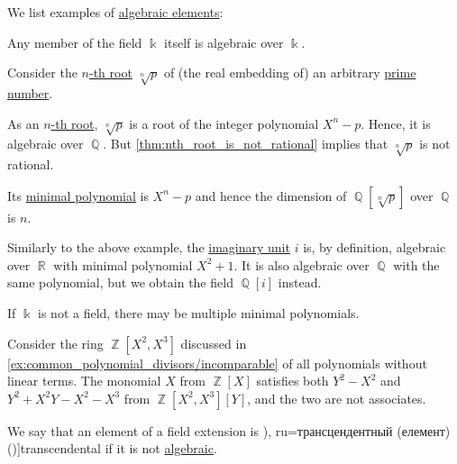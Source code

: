 \begin{example}\label{ex:def:algebraic_element}
  We list examples of \hyperref[def:algebraic_element]{algebraic elements}:
  \begin{thmenum}
     Any member of the field \( \Bbbk \) itself is algebraic over \( \Bbbk \).

     Consider the \hyperref[def:principal_nonnegative_nth_root]{\( n \)-th root} \( \sqrt[n]{ p } \) of (the real embedding of) an arbitrary \hyperref[def:prime_number]{prime number}.

    As an \hyperref[def:semigroup_power]{\( n \)-th root}, \( \sqrt[n]{ p } \) is a root of the integer polynomial \( X^n - p \). Hence, it is algebraic over \( \BbbQ \). But \cref{thm:nth_root_is_not_rational} implies that \( \sqrt[n]{ p } \) is not rational.

    Its \hyperref[def:algebraic_element_minimal_polynomial]{minimal polynomial} is \( X^n - p \) and hence the dimension of \( \BbbQ[\sqrt[n]{ p }] \) over \( \BbbQ \) is \( n \).

     Similarly to the above example, the \hyperref[def:complex_numbers]{imaginary unit} \( i \) is, by definition, algebraic over \( \BbbR \) with minimal polynomial \( X^2 + 1 \). It is also algebraic over \( \BbbQ \) with the same polynomial, but we obtain the field \( \BbbQ[i] \) instead.

     If \( \Bbbk \) is not a field, there may be multiple minimal polynomials.

    Consider the ring \( \BbbZ[X^2, X^3] \) discussed in \cref{ex:common_polynomial_divisors/incomparable} of all polynomials without linear terms. The monomial \( X \) from \( \BbbZ[X] \) satisfies both \( Y^2 - X^2 \) and \( Y^2 + X^2Y - X^2 - X^3 \) from \( \BbbZ[X^2, X^3][Y] \), and the two are not associates.
  \end{thmenum}
\end{example}

\begin{definition}\label{def:transcendental_element}
  We say that an element of a field extension is \term[bg=трансцендентен (елемент) (\cite[423]{Обрешков1962ВисшаАлгебра}), ru=трансцендентный (елемент) (\cite[407]{Винберг2014КурсАлгебры})]{transcendental} if it is not \hyperref[def:algebraic_element]{algebraic}.
\end{definition}

